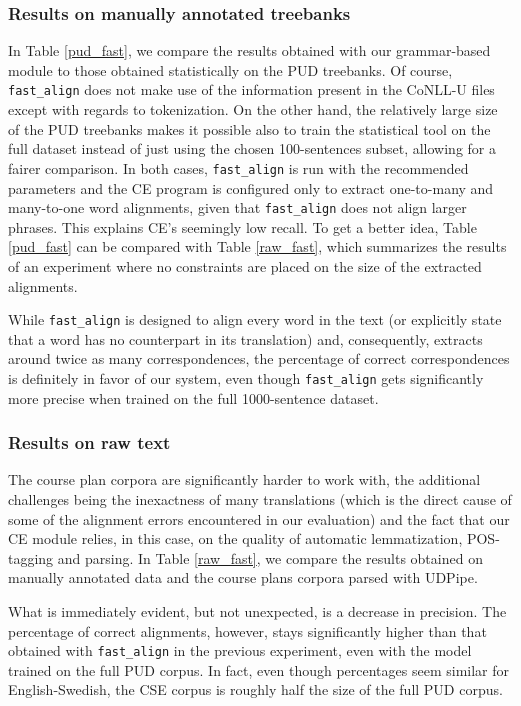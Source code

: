 \documentclass[11pt]{article}
\begin{document}
\subsubsection{Results on manually annotated treebanks} 
In Table \ref{pud_fast}, we compare the results obtained with our grammar-based module to those obtained statistically on the PUD treebanks. 
Of course, \texttt{fast\_align} does not make use of the information present in the CoNLL-U files except with regards to tokenization. 
On the other hand, the relatively large size of the PUD treebanks makes it possible also to train the statistical tool on the full dataset instead of just using the chosen 100-sentences subset, allowing for a fairer comparison. 
In both cases, \texttt{fast\_align} is run with the recommended parameters and the CE program is configured only to extract one-to-many and many-to-one word alignments, given that \texttt{fast\_align} does not align larger phrases. 
This explains CE's seemingly low recall.
To get a better idea, Table \ref{pud_fast} can be compared with Table \ref{raw_fast}, which summarizes the results of an experiment where no constraints are placed on the size of the extracted alignments.

While \texttt{fast\_align} is designed to align every word in the text (or explicitly state that a word has no counterpart in its translation) and, consequently, extracts around twice as many correspondences, the percentage of correct correspondences is definitely in favor of our system, even though \texttt{fast\_align} gets significantly more precise when trained on the full 1000-sentence dataset. 

\subsubsection{Results on raw text} \label{raw}
The course plan corpora are significantly harder to work with, the additional challenges being the inexactness of many translations (which is the direct cause of some of the alignment errors encountered in our evaluation) and the fact that our CE module relies, in this case, on the quality of automatic lemmatization, POS-tagging and parsing.
In Table \ref{raw_fast}, we compare the results obtained on manually annotated data and the course plans corpora parsed with UDPipe.  

What is immediately evident, but not unexpected, is a decrease in precision. 
The percentage of correct alignments, however, stays significantly higher than that obtained with \texttt{fast\_align} in the previous experiment, even with the model trained on the full PUD corpus. 
In fact, even though percentages seem similar for English-Swedish, the CSE corpus is roughly half the size of the full PUD corpus.
\end{document}
